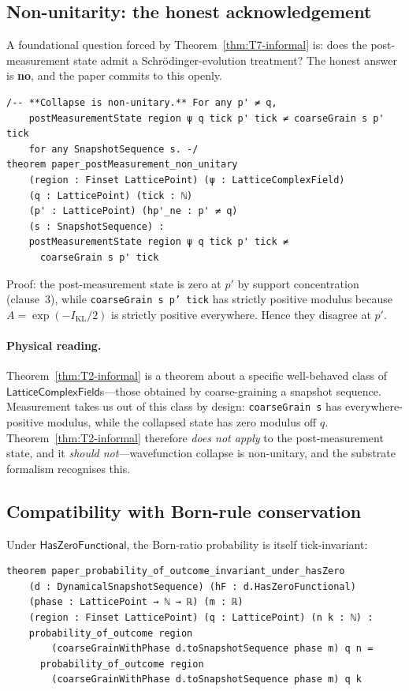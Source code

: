 \documentclass[11pt,a4paper,twoside]{article}
\theoremstyle{definition}
\newcommand{\KL}{I_{\mathrm{KL}}}
\newcommand{\HasZF}{\mathsf{HasZeroFunctional}}
\newcommand{\Lfield}{\mathsf{LatticeComplexField}}
\newcommand{\code}[1]{\texttt{#1}}
\begin{document}
\subsection{Non-unitarity: the honest
acknowledgement}\label{sec:measurement-nonunitary}

A foundational question forced by Theorem~\ref{thm:T7-informal} is:
does the post-measurement state admit a Schr\"odinger-evolution
treatment? The honest answer is \textbf{no}, and the paper commits to
this openly.

\begin{lstlisting}
/-- **Collapse is non-unitary.** For any p' ≠ q,
    postMeasurementState region ψ q tick p' tick ≠ coarseGrain s p' tick
    for any SnapshotSequence s. -/
theorem paper_postMeasurement_non_unitary
    (region : Finset LatticePoint) (ψ : LatticeComplexField)
    (q : LatticePoint) (tick : ℕ)
    (p' : LatticePoint) (hp'_ne : p' ≠ q)
    (s : SnapshotSequence) :
    postMeasurementState region ψ q tick p' tick ≠
      coarseGrain s p' tick
\end{lstlisting}

Proof: the post-measurement state is zero at $p'$ by support
concentration (clause~3), while \code{coarseGrain\,s\,p'\,tick} has
strictly positive modulus because $A=\exp(-\KL/2)$ is strictly
positive everywhere. Hence they disagree at $p'$.

\paragraph{Physical reading.}
Theorem~\ref{thm:T2-informal} is a theorem about a specific
well-behaved class of $\Lfield$s---those obtained by coarse-graining
a snapshot sequence. Measurement takes us out of this class by
design: \code{coarseGrain\,s} has everywhere-positive modulus, while
the collapsed state has zero modulus off $q$.
Theorem~\ref{thm:T2-informal} therefore \emph{does not apply} to the
post-measurement state, and it \emph{should not}---wavefunction
collapse is non-unitary, and the substrate formalism recognises this.

\subsection{Compatibility with Born-rule
conservation}\label{sec:measurement-compat}

Under $\HasZF$, the Born-ratio probability is itself tick-invariant:
\begin{lstlisting}
theorem paper_probability_of_outcome_invariant_under_hasZero
    (d : DynamicalSnapshotSequence) (hF : d.HasZeroFunctional)
    (phase : LatticePoint → ℕ → ℝ) (m : ℝ)
    (region : Finset LatticePoint) (q : LatticePoint) (n k : ℕ) :
    probability_of_outcome region
        (coarseGrainWithPhase d.toSnapshotSequence phase m) q n =
      probability_of_outcome region
        (coarseGrainWithPhase d.toSnapshotSequence phase m) q k
\end{lstlisting}
\end{document}
